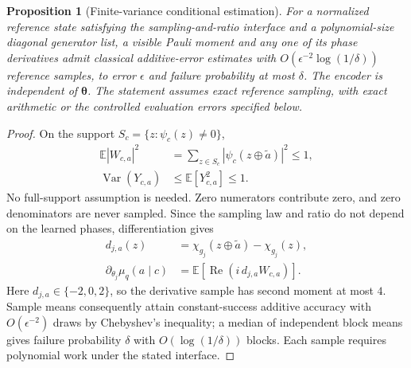 \documentclass[pra,aps,10pt,twocolumn,floatfix,superscriptaddress,
notitlepage,longbibliography]{revtex4-2}
\newtheorem{proposition}{Proposition}
\newcommand{\E}{\mathbb{E}}
\begin{document}
\begin{proposition}[Finite-variance conditional estimation]
For a normalized reference state satisfying the sampling-and-ratio interface and a polynomial-size diagonal generator list, a visible Pauli moment and any one of its phase derivatives admit classical additive-error estimates with $O(\epsilon^{-2}\log(1/\delta))$ reference samples, to error $\epsilon$ and failure probability at most $\delta$. The encoder is independent of $\boldsymbol\theta$. The statement assumes exact reference sampling, with exact arithmetic or the controlled evaluation errors specified below.
\end{proposition}
\begin{proof}
On the support $S_c=\{z:\psi_c(z)\ne0\}$,
\begin{equation}
\begin{aligned}
    \E|W_{c,a}|^2
    &=\sum_{z\in S_c}|\psi_c(z\oplus\widetilde a)|^2\leq1,\\
    \operatorname{Var}(Y_{c,a})&\leq\E[Y_{c,a}^2]\leq1.
\end{aligned}
\label{eq:ratio-second-moment}
\end{equation}
No full-support assumption is needed. Zero numerators contribute zero, and zero denominators are never sampled. Since the sampling law and ratio do not depend on the learned phases, differentiation gives
\begin{equation}
\begin{aligned}
    d_{j,a}(z)&=\chi_{g_j}(z\oplus\widetilde a)-\chi_{g_j}(z),\\
    \partial_{\theta_j}\mu_q(a\mid c)
      &=\E[\operatorname{Re}(i\,d_{j,a}W_{c,a})].
\end{aligned}
\label{eq:conditional-phase-gradient}
\end{equation}
Here $d_{j,a}\in\{-2,0,2\}$, so the derivative sample has second moment at most $4$. Sample means consequently attain constant-success additive accuracy with $O(\epsilon^{-2})$ draws by Chebyshev's inequality; a median of independent block means gives failure probability $\delta$ with $O(\log(1/\delta))$ blocks. Each sample requires polynomial work under the stated interface.
\end{proof}
\end{document}
